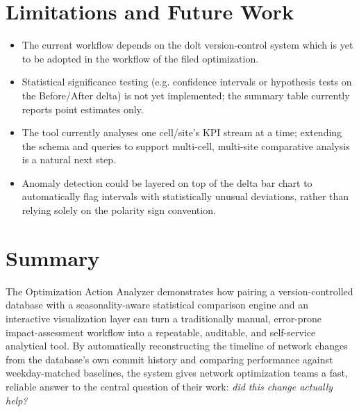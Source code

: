 \section{Limitations and Future Work}
\begin{itemize}
    \item The current workflow depends on the dolt version-control system which is yet to be adopted in the workflow of the filed optimization.
    \item Statistical significance testing (e.g. confidence intervals or
        hypothesis tests on the Before/After delta) is not yet
        implemented; the summary table currently reports point
        estimates only.
    \item The tool currently analyses one cell/site's KPI stream at a
        time; extending the schema and queries to support multi-cell,
        multi-site comparative analysis is a natural next step.
    \item Anomaly detection could be layered on top of the delta bar
        chart to automatically flag intervals with statistically
        unusual deviations, rather than relying solely on the polarity
        sign convention.
\end{itemize}

\section{Summary}
The Optimization Action Analyzer demonstrates how pairing a
version-controlled database with a seasonality-aware statistical
comparison engine and an interactive visualization layer can turn a
traditionally manual, error-prone impact-assessment workflow into a
repeatable, auditable, and self-service analytical tool. By automatically
reconstructing the timeline of network changes from the database's own
commit history and comparing performance against weekday-matched
baselines, the system gives network optimization teams a fast, reliable
answer to the central question of their work: \emph{did this change
actually help?}
